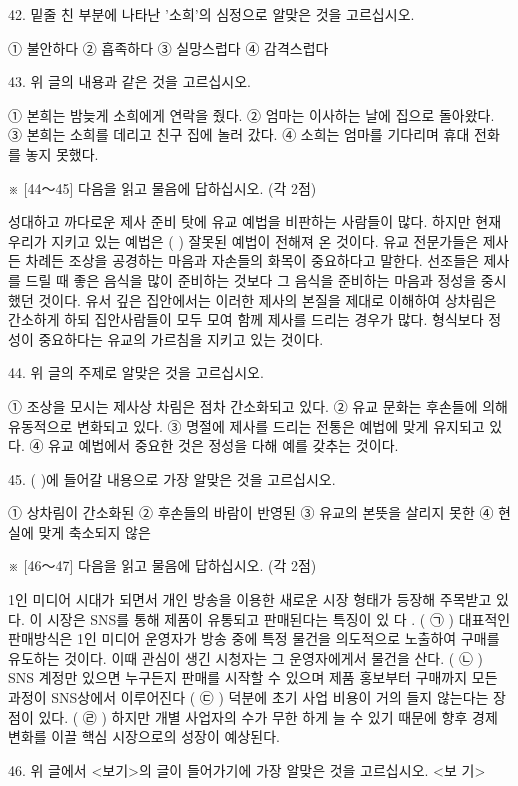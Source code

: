 \documentclass[12pt]{article}
\begin{document}
\begin{enumerate}[1.]
42. 밑줄 친 부분에 나타난 '소희'의 심정으로 알맞은 것을 고르십시오.

① 불안하다	② 흡족하다
③ 실망스럽다	④ 감격스럽다


43. 위 글의 내용과 같은 것을 고르십시오.

① 본희는 밤늦게 소희에게 연락을 줬다.
② 엄마는 이사하는 날에 집으로 돌아왔다.
③ 본희는 소희를 데리고 친구 집에 놀러 갔다.
④ 소희는 엄마를 기다리며 휴대 전화를 놓지 못했다.




※ [44～45] 다음을 읽고 물음에 답하십시오. (각 2점)

  성대하고 까다로운 제사 준비 탓에 유교 예법을 비판하는 사람들이
많다. 하지만 현재 우리가 지키고 있는 예법은 (      ) 잘못된
예법이 전해져 온 것이다. 유교 전문가들은 제사든 차례든 조상을 공경하는
마음과 자손들의 화목이 중요하다고 말한다. 선조들은 제사를 드릴 때
좋은 음식을 많이 준비하는 것보다 그 음식을 준비하는 마음과 정성을
중시했던 것이다. 유서 깊은 집안에서는 이러한 제사의 본질을 제대로
이해하여 상차림은 간소하게 하되 집안사람들이 모두 모여 함께 제사를
드리는 경우가 많다. 형식보다 정성이 중요하다는 유교의 가르침을 지키고
있는 것이다.


44. 위 글의 주제로 알맞은 것을 고르십시오.

① 조상을 모시는 제사상 차림은 점차 간소화되고 있다.
② 유교 문화는 후손들에 의해 유동적으로 변화되고 있다.
③ 명절에 제사를 드리는 전통은 예법에 맞게 유지되고 있다.
④ 유교 예법에서 중요한 것은 정성을 다해 예를 갖추는 것이다.


45. (   )에 들어갈 내용으로 가장 알맞은 것을 고르십시오.

① 상차림이 간소화된
② 후손들의 바람이 반영된
③ 유교의 본뜻을 살리지 못한
④ 현실에 맞게 축소되지 않은




※ [46～47] 다음을 읽고 물음에 답하십시오. (각 2점)

  1인 미디어 시대가 되면서 개인 방송을 이용한 새로운 시장 형태가 등장해
주목받고 있다. 이 시장은 SNS를 통해 제품이 유통되고 판매된다는 특징이
있 다 . ( ㉠ ) 대표적인 판매방식은 1인 미디어 운영자가 방송 중에
특정 물건을 의도적으로 노출하여 구매를 유도하는 것이다. 이때 관심이
생긴 시청자는 그 운영자에게서 물건을 산다. ( ㉡ ) SNS 계정만
있으면 누구든지 판매를 시작할 수 있으며 제품 홍보부터 구매까지 모든
과정이 SNS상에서 이루어진다 ( ㉢ ) 덕분에 초기 사업 비용이 거의
들지 않는다는 장점이 있다. ( ㉣ ) 하지만 개별 사업자의 수가 무한
하게 늘 수 있기 때문에 향후 경제 변화를 이끌 핵심 시장으로의 성장이
예상된다.


46.
위 글에서 <보기>의 글이 들어가기에 가장 알맞은 것을 고르십시오.
<보 기>


\end{enumerate}
\end{document}
